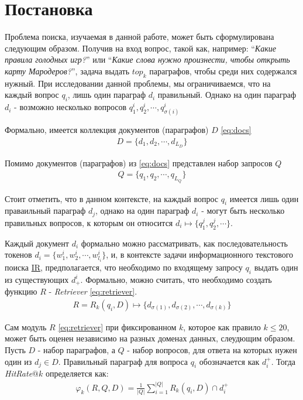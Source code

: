 
\section{Постановка}
\label{sec:background}

Проблема поиска, изучаемая в данной работе, может быть сформулирована следующим образом. 
Получив на вход вопрос, такой как, например: ``\emph{Какие правила голодных игр?}'' или ``\emph{Какие слова нужно произнести, чтобы открыть карту Мародеров?}'', задача выдать $top_k$ параграфов, 
чтобы среди них содержался нужный. При исследовании данной проблемы, мы ограничиваемся, что на каждый вопрос $q_i$, лишь один параграф $d_i$ правильный. Однако на один 
параграф $d_i$ - возможно несколько вопросов $q^i_1, q^i_2, \cdots, q^i_{\sigma(i)}$


Формально, имеется коллекция документов (параграфов) $D$ \eqref{eq:docs}
\begin{align}
    D=\{d_1, d_2, \cdots, d_{L_D}\}
    \label{eq:docs}
\end{align}

Помимо документов (параграфов) из \eqref{eq:docs} представлен набор запросов $Q$
\begin{align}
    Q=\{q_1, q_2, \cdots, q_{L_Q}\}
    \label{eq:queries}
\end{align}

Стоит отметить, что в данном контексте, на каждый вопрос $q_i$ имеется лишь один праваильный параграф $d_j$, однако на один параграф 
$d_i$ - могут быть несколько правильных вопросов, к которым он относится $d_i \mapsto \{q^j_1, q^j_2, \cdots \}$.

Каждый документ $d_i$ формально можно рассматривать, как последовательность токенов $d_i=\{w^i_1, w^i_2, \cdots, w^i_{l_i}\}$, и, в контексте задачи 
информационного текстового поиска \href{https://en.wikipedia.org/wiki/Information_retrieval}{IR}, предполагается, что необходимо по входящему запросу $q_i$ 
выдать один из существующих $d^i_{+}$. Формально, можно считать, что необходимо создать функцию $R$ - \textit{Retriever} \eqref{eq:retriever}.
\begin{align}
    R=R_k(q_i, D) \mapsto \{d_{\sigma(1)}, d_{\sigma(2)}, \cdots, d_{\sigma(k)}\}
    \label{eq:retriever}
\end{align}

Сам модуль $R$ \eqref{eq:retriever} при фиксированном $k$, которое как правило $k \leq 20$, может быть оценен независимо на разных доменах данных, слеудющим образом.
Пусть $D$ - набор параграфов, а $Q$ - набор вопросов, для ответа на которых нужен один из $d_j \in D$. Правильный параграф для вопроса $q_i$ обозначается как $d^{+}_i$. Тогда \textit{HitRate$@k$} определяется как:
\begin{align}
    \varphi_k(R, {Q, D})=\frac{1}{|Q|}\sum_{i=1}^{|Q|} R_k(q_i, D) \cap d^{+}_i
    \label{eq:varphi}
\end{align}

